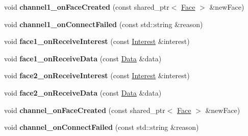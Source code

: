 \begin{DoxyCompactItemize}
\item 
void {\bfseries channel1\+\_\+on\+Face\+Created} (const shared\+\_\+ptr$<$ \hyperlink{classnfd_1_1Face}{Face} $>$ \&new\+Face)\hypertarget{classnfd_1_1tests_1_1EndToEndFixture_aa51312b39e9aaad574ee3f39f1c060f7}{}\label{classnfd_1_1tests_1_1EndToEndFixture_aa51312b39e9aaad574ee3f39f1c060f7}

\item 
void {\bfseries channel1\+\_\+on\+Connect\+Failed} (const std\+::string \&reason)\hypertarget{classnfd_1_1tests_1_1EndToEndFixture_a2725607de7f07f5209aab60ea3663b71}{}\label{classnfd_1_1tests_1_1EndToEndFixture_a2725607de7f07f5209aab60ea3663b71}

\item 
void {\bfseries face1\+\_\+on\+Receive\+Interest} (const \hyperlink{classndn_1_1Interest}{Interest} \&interest)\hypertarget{classnfd_1_1tests_1_1EndToEndFixture_a8afa70f742630b0af44adeb83fd31a53}{}\label{classnfd_1_1tests_1_1EndToEndFixture_a8afa70f742630b0af44adeb83fd31a53}

\item 
void {\bfseries face1\+\_\+on\+Receive\+Data} (const \hyperlink{classndn_1_1Data}{Data} \&data)\hypertarget{classnfd_1_1tests_1_1EndToEndFixture_ae32fe6a8257936ef35344807b9aba662}{}\label{classnfd_1_1tests_1_1EndToEndFixture_ae32fe6a8257936ef35344807b9aba662}

\item 
void {\bfseries face2\+\_\+on\+Receive\+Interest} (const \hyperlink{classndn_1_1Interest}{Interest} \&interest)\hypertarget{classnfd_1_1tests_1_1EndToEndFixture_a7b77ce229f425ce63f3d82752974e053}{}\label{classnfd_1_1tests_1_1EndToEndFixture_a7b77ce229f425ce63f3d82752974e053}

\item 
void {\bfseries face2\+\_\+on\+Receive\+Data} (const \hyperlink{classndn_1_1Data}{Data} \&data)\hypertarget{classnfd_1_1tests_1_1EndToEndFixture_a1fc77c4b1badb33a1ac8bfb756298a3a}{}\label{classnfd_1_1tests_1_1EndToEndFixture_a1fc77c4b1badb33a1ac8bfb756298a3a}

\item 
void {\bfseries channel\+\_\+on\+Face\+Created} (const shared\+\_\+ptr$<$ \hyperlink{classnfd_1_1Face}{Face} $>$ \&new\+Face)\hypertarget{classnfd_1_1tests_1_1EndToEndFixture_a4aac9066eff15592a8cef64bd2771601}{}\label{classnfd_1_1tests_1_1EndToEndFixture_a4aac9066eff15592a8cef64bd2771601}

\item 
void {\bfseries channel\+\_\+on\+Connect\+Failed} (const std\+::string \&reason)\hypertarget{classnfd_1_1tests_1_1EndToEndFixture_a180f9b16d6bb78e0e93add09594a53bf}{}\label{classnfd_1_1tests_1_1EndToEndFixture_a180f9b16d6bb78e0e93add09594a53bf}


\end{DoxyCompactItemize}
